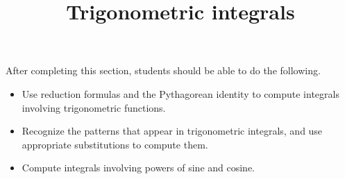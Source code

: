\documentclass{ximera}
\title{Trigonometric integrals}
\begin{document}
\begin{abstract}
\end{abstract}

\maketitle

\begin{sectionOutcomes}

After completing this section, students should be able to do the following.

\begin{itemize}
\item Use reduction formulas and the Pythagorean identity to compute
  integrals involving trigonometric functions.
\item Recognize the patterns that appear in trigonometric integrals,
  and use appropriate substitutions to compute them.
\item Compute integrals involving powers of sine and cosine.
\end{itemize}

\end{sectionOutcomes}
\end{document}
